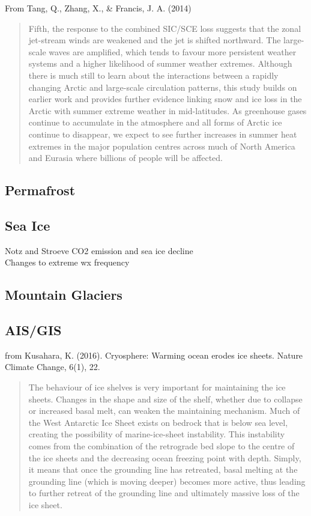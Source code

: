 From Tang, Q., Zhang, X., \& Francis, J. A. (2014) 
\begin{quotation}
	Fifth, the response to the combined SIC/SCE loss suggests that the zonal jet-stream winds are weakened and the jet is shifted northward. The large-scale waves are amplified, which tends to favour more persistent weather systems and a higher likelihood of summer weather extremes. Although there is much still to learn about the interactions between a rapidly changing Arctic and large-scale circulation patterns, this study builds on earlier work and provides further evidence linking snow and ice loss in the Arctic with summer extreme weather in mid-latitudes. As greenhouse gases continue to accumulate in the atmosphere and all forms of Arctic ice continue to disappear, we expect to see further increases in summer heat extremes in the major population centres across much of North America and Eurasia where billions of people will be affected.
\end{quotation}


\subsection{Permafrost}
\subsection{Sea Ice}
Notz and Stroeve CO2 emission and sea ice decline\\
Changes to extreme wx frequency\\
\subsection{Mountain Glaciers}
\subsection{AIS/GIS}
from Kusahara, K. (2016). Cryosphere: Warming ocean erodes ice sheets. Nature Climate Change, 6(1), 22. \begin{quotation}
	The behaviour of ice shelves is very important for maintaining the ice sheets. Changes in the shape and size of the shelf, whether due to collapse or increased basal melt, can weaken the maintaining mechanism. Much of the West Antarctic Ice Sheet exists on bedrock that is below sea level, creating the possibility of marine-ice-sheet instability. This instability comes from the combination of the retrograde bed slope to the centre of the ice sheets and the decreasing ocean freezing point with depth. Simply, it means that once the grounding line has retreated, basal melting at the grounding line (which is moving deeper) becomes more active, thus leading to further retreat of the grounding line and ultimately massive loss of the ice sheet.
\end{quotation}

